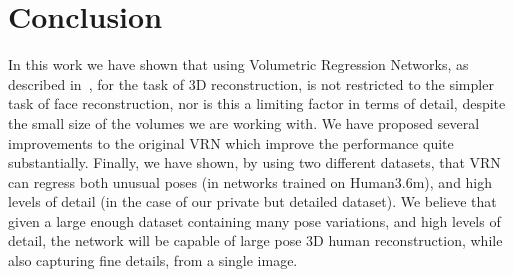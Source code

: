 
\section{Conclusion}

In this work we have shown that using Volumetric Regression Networks,
as described in~\cite{jackson2017vrn}, for the task of 3D
reconstruction, is not restricted to the simpler task of face
reconstruction, nor is this a limiting factor in terms of detail,
despite the small size of the volumes we are working with. We have
proposed several improvements to the original VRN which improve the
performance quite substantially. Finally, we have shown, by using two
different datasets, that VRN can regress both unusual poses (in
networks trained on Human3.6m), and high levels of detail (in the case
of our private but detailed dataset). We believe that given a large
enough dataset containing many pose variations, and high levels of
detail, the network will be capable of large pose 3D human
reconstruction, while also capturing fine details, from a single
image.






% 
% 
% 


